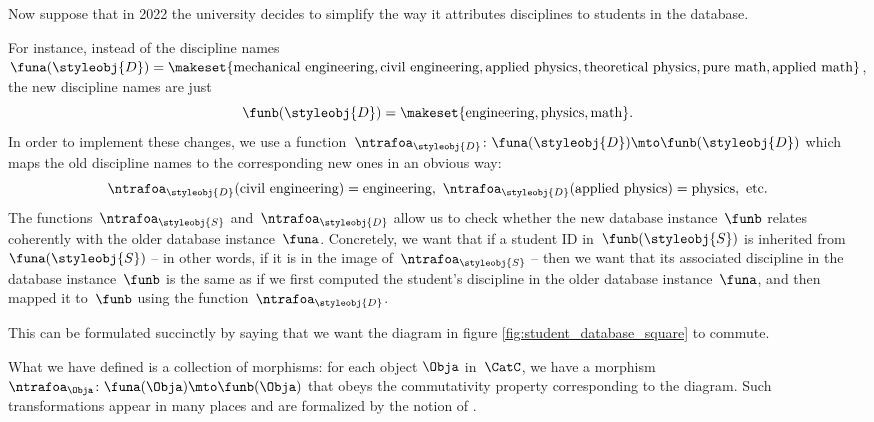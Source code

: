 Now suppose that in 2022 the university decides to simplify the way it attributes disciplines to students in the database.

For instance, instead of the discipline names~$\funa(\styleobj{D}) = \makeset{ \text{mechanical engineering}, \text{civil}\ \text{engineering}, \text{applied}\ \text{physics}, \text{theoretical}\ \text{physics}, \text{pure}\ \text{math}, \linebreak[1]\text{applied}\ \text{math} }$, the new discipline names are just
%
\begin{equation}
    \funb(\styleobj{D}) = \makeset{ \text{engineering}, \text{physics}, \text{math} }.
\end{equation}
%
In order to implement these changes, we use a function~$\ntrafoa_{\styleobj{D}}\colon \funa(\styleobj{D}) \mto \funb(\styleobj{D})$ which maps the old discipline names to the corresponding new ones in an obvious way:
\begin{equation}
    \ntrafoa_{\styleobj{D}}(\text{civil engineering}) = \text{engineering}, \ \ntrafoa_{\styleobj{D}}(\text{applied physics}) = \text{physics}, \ \text{etc.}
\end{equation}
The functions~$\ntrafoa_\styleobj{S}$ and~$\ntrafoa_\styleobj{D}$ allow us to check whether the new database instance~$\funb$ relates coherently with the older database instance~$\funa$.
Concretely, we want that if a student ID in~$\funb(\styleobj{S})$ is inherited from~$\funa(\styleobj{S})$ -- in other words, if it is in the image of~$\ntrafoa_{\styleobj{S}}$ -- then we want that its associated discipline in the database instance~$\funb$ is the same as if we first computed the student's discipline in the older database instance~$\funa$, and then mapped it to~$\funb$ using the function~$\ntrafoa_{\styleobj{D}}$.

%
\begin{marginfigure}
    \centering
    \caption{}
    \label{fig:student_database_square}
\end{marginfigure}
%

This can be formulated succinctly by saying that we want the diagram in figure \cref{fig:student_database_square} to commute.

What we have defined is a collection of morphisms: for each object $\Obja$ in~$\CatC$, we have a morphism~$\ntrafoa_\Obja \colon \funa(\Obja) \mto \funb(\Obja)$ that obeys the commutativity property corresponding to the diagram.
Such transformations appear in many places and are formalized by the notion of .
